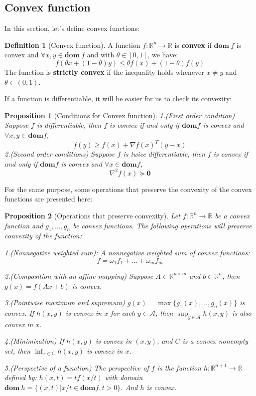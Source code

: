 \documentclass[
]{book}
\newtheorem{proposition}{Proposition}[chapter]
\theoremstyle{definition}
\newtheorem{definition}{Definition}[chapter]
\theoremstyle{definition}
\theoremstyle{definition}
\theoremstyle{definition}
\theoremstyle{remark}
\begin{document}
\subsection{Convex function}\label{appconvex-theory-convexfunction}

In this section, let's define convex functions:

\begin{definition}[Convex function]
\protect\hypertarget{def:defcvxfunc}{}\label{def:defcvxfunc}A function \(f:\mathbb{R}^n\to\mathbb{R}\) is \textbf{convex} if \(\textbf{dom}\ f\) is convex and \(\forall x,y\in \textbf{dom}\ f\) and with \(\theta \in [0,1]\), we have:\[f(\theta x +(1-\theta)y)\leq \theta f(x) + (1-\theta)f(y)\]
The function is \textbf{strictly convex} if the inequality holds whenever \(x\neq y\) and \(\theta\in (0,1)\).
\end{definition}

If a function is differentiable, it will be easier for us to check its convexity:

\begin{proposition}[Conditions for Convex function]
\protect\hypertarget{prp:decidecvx}{}\label{prp:decidecvx}1.(First order condition) Suppose \(f\) is differentiable, then \(f\) is convex if and only if \(\textbf{dom} f\) is convex and \(\forall x,y\in \textbf{dom} f\), \[f(y)\geq f(x) +\nabla f(x)^T(y-x)\]
2.(Second order conditions) Suppose \(f\) is twice differentiable, then \(f\) is convex if and only if \(\textbf{dom} f\) is convex and \(\forall x\in \textbf{dom} f\), \[\nabla^2 f(x) \succeq \textbf{0}\]
\end{proposition}

For the same purpose, some operations that preserve the convexity of the convex functions are presented here:

\begin{proposition}[Operations that preserve convexity]
\protect\hypertarget{prp:preservecvx}{}\label{prp:preservecvx}Let \(f:\mathbb{R}^n\to\mathbb{R}\) be a convex function and \(g_1,...,g_n\) be convex functions. The following operations will preserve convexity of the function:

1.(Nonnegative weighted sum): A nonnegative weighted sum of convex functions: \[f = \omega_1f_1 + ... +\omega_mf_m\]

2.(Composition with an affine mapping) Suppose \(A\in \mathbb{R}^{n\times m}\) and \(b\in \mathbb{R}^n\), then \(g(x) = f(Ax+b)\) is convex.

3.(Pointwise maximum and supremum) \(g(x) = \max\{g_1(x),...,g_n(x)\}\) is convex. If \(h(x,y)\) is convex in \(x\) for each \(y\in\mathcal{A}\), then \(\sup_{y\in\mathcal{A}} h(x,y)\) is also convex in \(x\).

4.(Minimization) If \(h(x,y)\) is convex in \((x,y)\), and \(C\) is a convex nonempty set, then \(\inf_{x\in C} h(x,y)\) is convex in \(x\).

5.(Perspective of a function) The perspective of \(f\) is the function \(h:\mathbb{R}^{n+1}\to\mathbb{R}\) defined by: \(h(x,t) = tf(x/t)\) with domain \(\textbf{dom}\ h=\{(x,t)|x/t\in\textbf{dom} f,t>0\}\). And \(h\) is convex.
\end{proposition}
\end{document}
